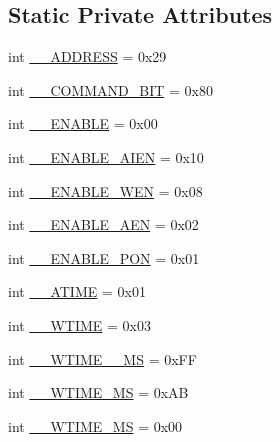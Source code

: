 \subsection*{Static Private Attributes}
\begin{DoxyCompactItemize}
\item 
int \hyperlink{classlibsensorPy_1_1concretesensor_1_1tcs34725_1_1TCS34725_a46c3ac5d9ef087eeb55d11f874f65d47}{\+\_\+\+\_\+\+A\+D\+D\+R\+E\+S\+S} = 0x29
\item 
int \hyperlink{classlibsensorPy_1_1concretesensor_1_1tcs34725_1_1TCS34725_ad2bc67c1c6af90c009b2ecd023bbe591}{\+\_\+\+\_\+\+C\+O\+M\+M\+A\+N\+D\+\_\+\+B\+I\+T} = 0x80
\item 
int \hyperlink{classlibsensorPy_1_1concretesensor_1_1tcs34725_1_1TCS34725_ae58ca726694b51355ae9de43855e054c}{\+\_\+\+\_\+\+E\+N\+A\+B\+L\+E} = 0x00
\item 
int \hyperlink{classlibsensorPy_1_1concretesensor_1_1tcs34725_1_1TCS34725_a1c4f048e4ea7bea1c7f496b09ad84ed7}{\+\_\+\+\_\+\+E\+N\+A\+B\+L\+E\+\_\+\+A\+I\+E\+N} = 0x10
\item 
int \hyperlink{classlibsensorPy_1_1concretesensor_1_1tcs34725_1_1TCS34725_af05d8327becc21aab92fdc411a88b96a}{\+\_\+\+\_\+\+E\+N\+A\+B\+L\+E\+\_\+\+W\+E\+N} = 0x08
\item 
int \hyperlink{classlibsensorPy_1_1concretesensor_1_1tcs34725_1_1TCS34725_af3621ee75a6bffcb15afe790450da9b9}{\+\_\+\+\_\+\+E\+N\+A\+B\+L\+E\+\_\+\+A\+E\+N} = 0x02
\item 
int \hyperlink{classlibsensorPy_1_1concretesensor_1_1tcs34725_1_1TCS34725_a696a492d9732a6eb83e529fdc7fbcbf7}{\+\_\+\+\_\+\+E\+N\+A\+B\+L\+E\+\_\+\+P\+O\+N} = 0x01
\item 
int \hyperlink{classlibsensorPy_1_1concretesensor_1_1tcs34725_1_1TCS34725_a29b12d6bee1906c9915996b3a391ec67}{\+\_\+\+\_\+\+A\+T\+I\+M\+E} = 0x01
\item 
int \hyperlink{classlibsensorPy_1_1concretesensor_1_1tcs34725_1_1TCS34725_a1e9aeed77487724074f252dd3c6a9c5c}{\+\_\+\+\_\+\+W\+T\+I\+M\+E} = 0x03
\item 
int \hyperlink{classlibsensorPy_1_1concretesensor_1_1tcs34725_1_1TCS34725_a52576da78baa8295d02a024caad30e5f}{\+\_\+\+\_\+\+W\+T\+I\+M\+E\+\_\+\_\+M\+S} = 0x\+F\+F
\item 
int \hyperlink{classlibsensorPy_1_1concretesensor_1_1tcs34725_1_1TCS34725_a82f052f44ac85d2bb14c03da2615674b}{\+\_\+\+\_\+\+W\+T\+I\+M\+E\+\_\+M\+S} = 0x\+A\+B
\item 
int \hyperlink{classlibsensorPy_1_1concretesensor_1_1tcs34725_1_1TCS34725_ad606986091b4ef12bc6a638400275d0c}{\+\_\+\+\_\+\+W\+T\+I\+M\+E\+\_\+M\+S} = 0x00

\end{DoxyCompactItemize}
